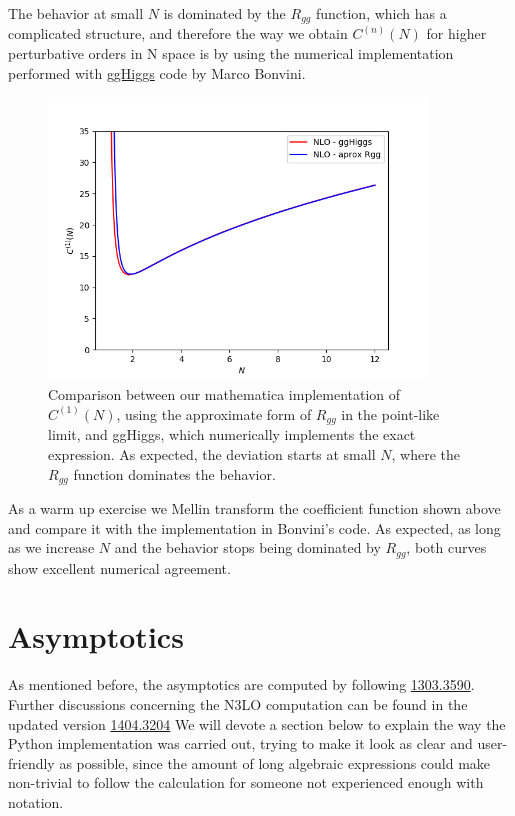 \documentclass[12pt]{article}
\begin{document}
The behavior at small $N$ is dominated by the $R_{gg}$ function, which has a complicated structure, and therefore the way we obtain $C^{(n)}(N)$ for higher perturbative orders in N space is by using the numerical implementation performed with \href{https://www.ge.infn.it/~bonvini/higgs/}{ggHiggs} code by Marco Bonvini.
\begin{figure}
	\center
	\includegraphics[width = 10cm]{plots/data/check_ggHiggs.png}
	\caption{Comparison between our mathematica implementation of $C^{(1)}(N)$, using the approximate form of $R_{gg}$ in the point-like limit, and ggHiggs, which numerically implements the exact expression. As expected, the deviation starts at small $N$, where the $R_{gg}$ function dominates the behavior.}
	\label{fig:check_data}
\end{figure}

As a warm up exercise we Mellin transform the coefficient function shown above and compare it with the implementation in Bonvini's code. As expected, as long as we increase $N$ and the behavior stops being dominated by $R_{gg}$, both curves show excellent numerical agreement.\\

\section{Asymptotics}

As mentioned before, the asymptotics are computed by following \href{https://arxiv.org/abs/1303.3590}{1303.3590}. Further discussions concerning the N3LO computation can be found in the updated version \href{https://arxiv.org/abs/1404.3204}{1404.3204} We will devote a section below to explain the way the Python implementation was carried out, trying to make it look as clear and user-friendly as possible, since the amount of long algebraic expressions could make non-trivial to follow the calculation for someone not experienced enough with notation.
\end{document}
